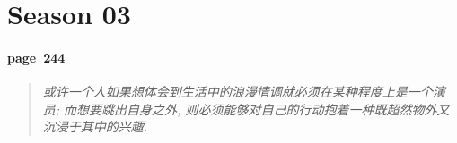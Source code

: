 \section{Season 03}

\paragraph*{page~244}
\begin{quotation}
    \itshape
    或许一个人如果想体会到生活中的浪漫情调就必须在某种程度上是一个演员; 而想要跳出自身之外, 则必须能够对自己的行动抱着一种既超然物外又沉浸于其中的兴趣. 
\end{quotation}


